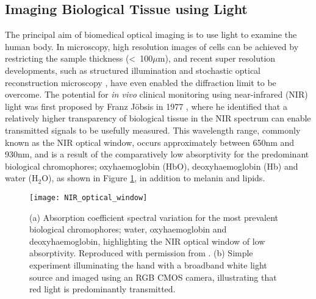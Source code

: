 \documentclass[twoside]{bhamthesis}
\theoremstyle{definition}
\begin{document}

\subsection{Imaging Biological Tissue using Light}

The principal aim of biomedical optical imaging is to use light to examine the human body. In microscopy, high resolution images of cells can be achieved by restricting the sample thickness (<~100$\mu$m), and recent super resolution developments, such as structured illumination \cite{gustafsson2000surpassing} and stochastic optical reconstruction microscopy \cite{rust2006sub}, have even enabled the diffraction limit to be overcome. The potential for \textit{in vivo} clinical monitoring using near-infrared (NIR) light was first proposed by Franz J\"obsis in 1977 \cite{jobsis1977noninvasive}, where he identified that a relatively higher transparency of biological tissue in the NIR spectrum can enable transmitted signals to be usefully measured. This wavelength range, commonly known as the NIR optical window, occurs approximately between 650nm and 930nm, and is a result of the comparatively low absorptivity for the predominant biological chromophores; oxyhaemoglobin (HbO), deoxyhaemoglobin (Hb) and water ($\mathrm{H_2O}$), as shown in Figure \ref{fig:NIR_window}, in addition to melanin and lipids. 

\begin{figure}[!ht]
  \centering
  \texttt{[image: NIR\_optical\_window]}
\caption{(a) Absorption coefficient spectral variation for the most prevalent biological chromophores; water, oxyhaemoglobin and deoxyhaemoglobin, highlighting the NIR optical window of low absorptivity. Reproduced with permission from \cite{phan2010practical}. (b) Simple experiment illuminating the hand with a broadband white light source and imaged using an RGB CMOS camera, illustrating that red light is predominantly transmitted.}
  \label{fig:NIR_window}
\end{figure}

\end{document}
